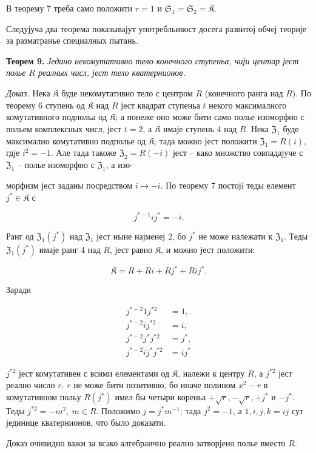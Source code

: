 \documentclass[11pt]{article}
\begin{document}
В теорему 7 треба само положити \(r=1\) и \(\mathfrak S_1=\mathfrak S_2=\mathfrak K\).

Следујуча два теорема показывајут употребльивост досега развитој обчеј теорије за разматранье специалных пытань.

\textbf{Теорем 9.} \emph{Једино некомутативно тело конечного ступеньа, чији центар јест полье \(R\) реалных числ, јест тело кватернионов.}

\emph{Доказ.} Нека \(\mathfrak K\) буде некомутативно тело с центром \(R\) (конечного ранга над \(R\)). По теорему 6 ступень од \(\mathfrak K\) над \(R\) јест квадрат ступеньа \(t\) некого максималного комутативного подпольа од \(\mathfrak K\); а понеже оно може бити само полье изоморфно с польем комплексных числ, јест \(t=2\), а \(\mathfrak K\) имаје ступень 4 над \(R\). Нека \(\mathfrak Z_1\) буде максимално комутативно подполье од \(\mathfrak K\); тада можно јест положити \(\mathfrak Z_1=R(i)\), гдје \(i^2=-1\). Але тада такоже \(\mathfrak Z_2=R(-i)\) јест -- како множство совпадајуче с \(\mathfrak Z_1\) -- полье изоморфно с \(\mathfrak Z_1\), а изо-

морфизм јест заданы посредством \(i\mapsto -i\). По теорему 7 постојí теды елемент \(j^*\in\mathfrak K\) с

\[
j^{*-1}ij^*=-i.
\]

Ранг од \(\mathfrak Z_1(j^*)\) над \(\mathfrak Z_1\) јест ныне најменеј 2, бо \(j^*\) не може належати к \(\mathfrak Z_1\). Теды \(\mathfrak Z_1(j^*)\) имаје ранг 4 над \(R\), јест равно \(\mathfrak K\), и можно јест положити:

\[
\mathfrak K=R+Ri+Rj^*+Rij^*.
\]

Заради

\[
\begin{aligned}
j^{*-2}1j^{*2}&=1,\\
j^{*-2}ij^{*2}&=i,\\
j^{*-2}j^*j^{*2}&=j^*,\\
j^{*-2}ij^*j^{*2}&=ij^*
\end{aligned}
\]

\(j^{*2}\) јест комутативен с всими елементами од \(\mathfrak K\), належи к центру \(R\), а \(j^{*2}\) јест реално число \(r\). \(r\) не може бити позитивно, бо иначе полином \(x^2-r\) в комутативном польу \(R(j^*)\) имел бы четыри кореньа \(+\sqrt r,-\sqrt r,+j^*\) и \(-j^*\). Теды \(j^{*2}=-m^2,\ m\in R\). Положимо \(j=j^*m^{-1}\); тада \(j^2=-1\), а \(1,i,j,k=ij\) сут јединице кватернионов, что было доказати.

Доказ очивидно важи за всако алгебраично реално затворјено полье вместо \(R\).
\end{document}
